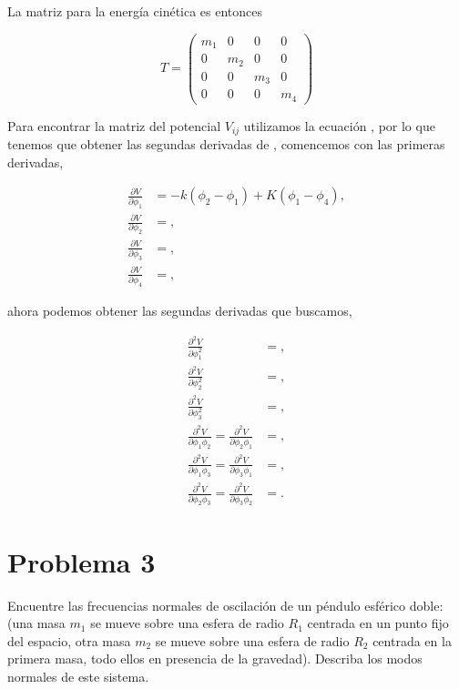 \documentclass[a4paper,10pt]{article}
\numberwithin{equation}{section}
\begin{document}
La matriz para la energía cinética es entonces

\begin{equation}
 T = \begin{pmatrix}
      m_1 & 0 & 0 & 0 \\
      0 & m_2 & 0 & 0 \\
      0 & 0 & m_3 & 0 \\
      0 & 0 & 0 & m_4
     \end{pmatrix}
\end{equation}

Para encontrar la matriz del potencial $V_{ij}$ utilizamos la ecuación ,
por lo que tenemos que obtener las segundas derivadas de , comencemos 
con las primeras derivadas,

\begin{align*}
 \frac{\partial V}{\partial \phi_1} &= -k(\phi_2 - \phi_1) + K(\phi_1 - \phi_4), \\
 \frac{\partial V}{\partial \phi_2} &= , \\
 \frac{\partial V}{\partial \phi_3} &= , \\
 \frac{\partial V}{\partial \phi_4} &=  ,
\end{align*}

ahora podemos obtener las segundas derivadas que buscamos,

\begin{align*}
 \frac{\partial^2 V}{\partial \phi_1^2} &= , \\
 \frac{\partial^2 V}{\partial \phi_2^2} &= , \\
 \frac{\partial^2 V}{\partial \phi_3^2} &= , \\
 \frac{\partial^2 V}{\partial \phi_1\phi_2} = \frac{\partial^2 V}{\partial \phi_2\phi_1}&= , \\
 \frac{\partial^2 V}{\partial \phi_1\phi_3} = \frac{\partial^2 V}{\partial \phi_3\phi_1}  &= , \\
 \frac{\partial^2 V}{\partial \phi_2\phi_3} =  \frac{\partial^2 V}{\partial \phi_3\phi_2} &= .
\end{align*}


\section{Problema 3}

Encuentre las frecuencias normales de oscilación de un péndulo esférico doble: (una 
masa $m_1$ se mueve sobre una esfera de radio $R_1$ centrada en un punto fijo del 
espacio, otra masa $m_2$ se mueve sobre una esfera de radio $R_2$ centrada en la 
primera masa, todo ellos en presencia de la gravedad). Describa los modos normales 
de este sistema.
\end{document}
